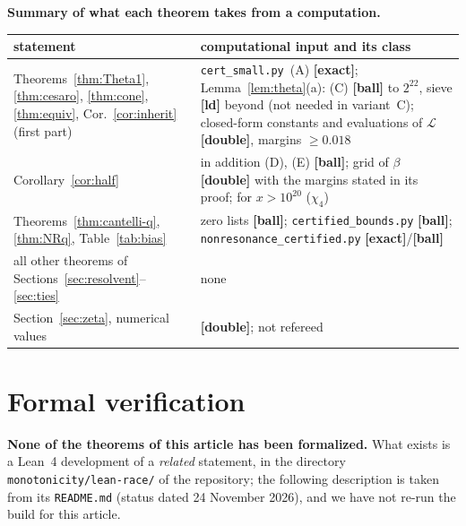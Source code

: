 \documentclass[11pt]{amsart}
\theoremstyle{definition}
\numberwithin{equation}{section}
\newcommand{\cL}{\mathcal L}          %
\begin{document}
\medskip\noindent\textbf{Summary of what each theorem takes from a
computation.}
\begin{center}
\small
\begin{tabular}{p{}p{}}
\toprule
statement & computational input and its class\\
\midrule
Theorems~\ref{thm:Theta1}, \ref{thm:cesaro}, \ref{thm:cone},
\ref{thm:equiv}, Cor.~\ref{cor:inherit} (first part) &
\texttt{cert\_small.py}~(A) \textbf{[exact]};
Lemma~\ref{lem:theta}(a): (C) \textbf{[ball]} to $2^{22}$, sieve
\textbf{[ld]} beyond (not needed in variant~C); closed-form constants
and evaluations of $\cL$ \textbf{[double]}, margins $\ge0.018$\\
Corollary~\ref{cor:half} & in addition (D), (E) \textbf{[ball]};
grid of $\beta$ \textbf{[double]} with the margins stated in its
proof; \cite{BKLNW21} for $x>10^{20}$ ($\chi_4$)\\
Theorems~\ref{thm:cantelli-q}, \ref{thm:NRq},
Table~\ref{tab:bias} & zero lists \textbf{[ball]};
\texttt{certified\_bounds.py} \textbf{[ball]};
\texttt{nonresonance\_certified.py} \textbf{[exact]}/\textbf{[ball]}\\
all other theorems of Sections~\ref{sec:resolvent}--\ref{sec:ties} &
none\\
Section~\ref{sec:zeta}, numerical values & \textbf{[double]}; not
refereed\\
\bottomrule
\end{tabular}
\end{center}

\section{Formal verification}\label{sec:formal}

\noindent\textbf{None of the theorems of this article has been
formalized.} What exists is a Lean~4 development of a \emph{related}
statement, in the directory \texttt{monotonicity/lean-race/} of the
repository; the following description is taken from its
\texttt{README.md} (status dated 24 November 2026), and we have not
re-run the build for this article.
\end{document}
